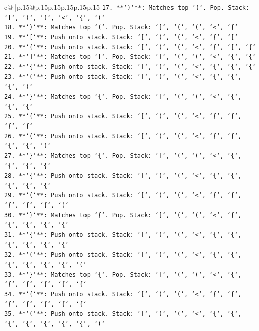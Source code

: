 \documentclass{article}
\begin{document}
{\begin{supertabular}{c@{$\;$}|p{.15\linewidth}@{}p{.15\linewidth}p{.15\linewidth}p{.15\linewidth}p{.15\linewidth}p{.15\linewidth}}
{{{\texttt{17. **`)`**: Matches top `(`. Pop. Stack: `{[}`, `(`, `(`, `<`, `\{`, `(`} \\
\texttt{18. **`)`**: Matches top `(`. Pop. Stack: `{[}`, `(`, `(`, `<`, `\{`} \\
\texttt{19. **`{[}`**: Push onto stack. Stack: `{[}`, `(`, `(`, `<`, `\{`, `{[}`} \\
\texttt{20. **`\{`**: Push onto stack. Stack: `{[}`, `(`, `(`, `<`, `\{`, `{[}`, `\{`} \\
\texttt{21. **`{]}`**: Matches top `{[}`. Pop. Stack: `{[}`, `(`, `(`, `<`, `\{`, `\{`} \\
\texttt{22. **`\{`**: Push onto stack. Stack: `{[}`, `(`, `(`, `<`, `\{`, `\{`, `\{`} \\
\texttt{23. **`(`**: Push onto stack. Stack: `{[}`, `(`, `(`, `<`, `\{`, `\{`, `\{`, `(`} \\
\texttt{24. **`\}`**: Matches top `\{`. Pop. Stack: `{[}`, `(`, `(`, `<`, `\{`, `\{`, `\{`} \\
\texttt{25. **`\{`**: Push onto stack. Stack: `{[}`, `(`, `(`, `<`, `\{`, `\{`, `\{`, `\{`} \\
\texttt{26. **`(`**: Push onto stack. Stack: `{[}`, `(`, `(`, `<`, `\{`, `\{`, `\{`, `\{`, `(`} \\
\texttt{27. **`\}`**: Matches top `\{`. Pop. Stack: `{[}`, `(`, `(`, `<`, `\{`, `\{`, `\{`, `\{`} \\
\texttt{28. **`\{`**: Push onto stack. Stack: `{[}`, `(`, `(`, `<`, `\{`, `\{`, `\{`, `\{`, `\{`} \\
\texttt{29. **`(`**: Push onto stack. Stack: `{[}`, `(`, `(`, `<`, `\{`, `\{`, `\{`, `\{`, `\{`, `(`} \\
\texttt{30. **`\}`**: Matches top `\{`. Pop. Stack: `{[}`, `(`, `(`, `<`, `\{`, `\{`, `\{`, `\{`, `\{`} \\
\texttt{31. **`\{`**: Push onto stack. Stack: `{[}`, `(`, `(`, `<`, `\{`, `\{`, `\{`, `\{`, `\{`, `\{`} \\
\texttt{32. **`(`**: Push onto stack. Stack: `{[}`, `(`, `(`, `<`, `\{`, `\{`, `\{`, `\{`, `\{`, `\{`, `(`} \\
\texttt{33. **`\}`**: Matches top `\{`. Pop. Stack: `{[}`, `(`, `(`, `<`, `\{`, `\{`, `\{`, `\{`, `\{`, `\{`} \\
\texttt{34. **`\{`**: Push onto stack. Stack: `{[}`, `(`, `(`, `<`, `\{`, `\{`, `\{`, `\{`, `\{`, `\{`, `\{`} \\
\texttt{35. **`(`**: Push onto stack. Stack: `{[}`, `(`, `(`, `<`, `\{`, `\{`, `\{`, `\{`, `\{`, `\{`, `\{`, `(`} \\
}}}
\end{supertabular}}
\end{document}
